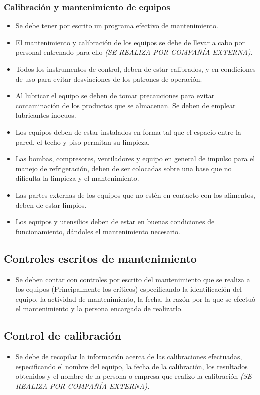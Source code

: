 \subsubsection{Calibración y mantenimiento de equipos}
\begin{itemize}
	\item Se debe tener por escrito un programa efectivo de mantenimiento.
	\item El mantenimiento y calibración de los equipos se debe de llevar a cabo por personal entrenado para ello \emph{(SE REALIZA POR COMPAÑÍA EXTERNA).}
	\item Todos los instrumentos de control, deben de estar calibrados, y en condiciones de uso para evitar desviaciones de los patrones de operación.
	\item Al lubricar el equipo se deben de tomar precauciones para evitar contaminación de los productos que se almacenan. Se deben de emplear lubricantes inocuos.
	\item Los equipos deben de estar instalados en forma tal que el espacio entre la pared, el techo y piso permitan su limpieza.
	\item Las bombas, compresores, ventiladores y equipo en general de impulso para el manejo de refrigeración, deben de ser colocadas sobre una base que no dificulta la limpieza y el mantenimiento.
	\item Las partes externas de los equipos que no estén en contacto con los alimentos, deben de estar limpios.
	\item Los equipos y utensilios deben de estar en buenas condiciones de funcionamiento, dándoles el mantenimiento necesario.
\end{itemize}

\subsection{Controles escritos de mantenimiento}
\begin{itemize}
	\item Se deben contar con controles por escrito del mantenimiento que se realiza a los equipos (Principalmente los críticos) especificando la identificación del equipo, la actividad de mantenimiento, la fecha, la razón por la que se efectuó el mantenimiento y la persona encargada de realizarlo.
\end{itemize}

\subsection{Control de calibración}
\begin{itemize}
	\item Se debe de recopilar la información acerca de las calibraciones efectuadas, especificando el nombre del equipo, la fecha de la calibración, los resultados obtenidos y el nombre de la persona o empresa que realizo la calibración \emph{(SE REALIZA POR COMPAÑÍA EXTERNA).}
\end{itemize}

